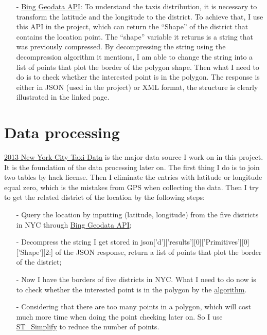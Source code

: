 \documentclass[a4paper]{article}
\begin{document}
\begin{itemize}
\item[-] \href{https://msdn.microsoft.com/en-us/library/dn306801.aspx}{Bing Geodata API}: To understand the taxis distribution, it is necessary to transform the latitude and the longitude to the district. To achieve that, I use this API in the project, which can return the ``Shape'' of the district that contains the location point. The ``shape'' variable it returns is a string that was previously compressed. By decompressing the string using the decompression algorithm it mentions, I am able to change the string into a list of points that plot the border of the polygon shape. Then what I need to do is to check whether the interested point is in the polygon. The response is either in JSON (used in the project) or XML format, the structure is clearly illustrated in the linked page. 
\end{itemize}

\section{Data processing}
\href{http://publish.illinois.edu/dbwork/open-data/}{2013 New York City Taxi Data} is the major data source I work on in this project. It is the foundation of the data processing later on. The first thing I do is to join two tables by hack license. Then I eliminate the entries with latitude or longitude equal zero, which is the mistakes from GPS when collecting the data. Then I try to get the related district of the location by the following steps:
\begin{itemize}
\item[-] Query the location by inputting (latitude, longitude) from the five districts in NYC through \href{https://msdn.microsoft.com/en-us/library/dn306801.aspx}{Bing Geodata API};
\item[-] Decompress the string I get stored in json['d']['results'][0]['Primitives'][0]['Shape'][2:] of the JSON response, return a list of points that plot the border of the district;
\item[-] Now I have the borders of five districts in NYC. What I need to do now is to check whether the interested point is in the polygon by the \href{http://www.ariel.com.au/a/python-point-int-poly.html}{algorithm}.
\item[-] Considering that there are too many points in a polygon, which will cost much more time when doing the point checking later on. So I use \href{http://postgis.refractions.net/documentation/manual-svn/ST_Simplify.html}{ST\_Simplify} to reduce the number of points.
\end{itemize}
\end{document}
